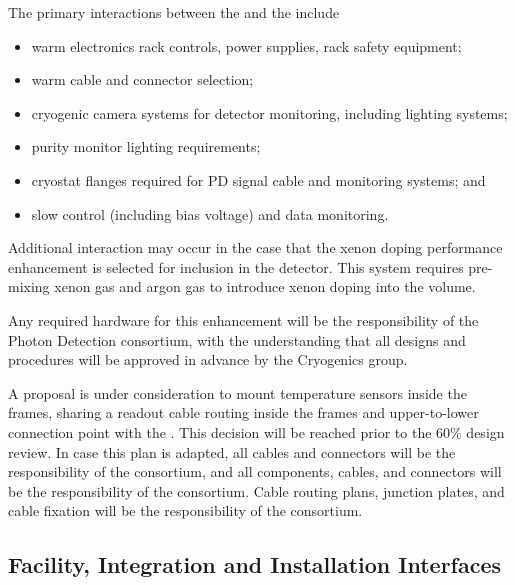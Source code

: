 The primary interactions between the  and the  include

\begin{itemize}
    \item warm electronics rack controls, power supplies, rack safety equipment;
    \item warm cable and connector selection;
    \item cryogenic camera systems for detector monitoring, including lighting systems;
    \item purity monitor lighting requirements;
    \item cryostat flanges required for PD signal cable and monitoring systems; and
    \item {} slow control (including bias voltage) and data monitoring.
\end{itemize}

Additional interaction may occur in the case that the xenon doping performance enhancement is selected for inclusion in the detector.  This system requires pre-mixing xenon gas and argon gas to introduce xenon doping into the \lar volume. 


Any required hardware for this enhancement will be the responsibility of the Photon Detection consortium, with the understanding that all designs and procedures will be approved in advance by the Cryogenics group. 


A proposal is under consideration to mount  temperature sensors inside the  frames, sharing a readout cable routing inside the  frames and upper-to-lower  connection point with the .  This decision will be reached prior to the 60\% design review.  In case this plan is adapted, all  cables and connectors will be the responsibility of the  consortium, and all  components, cables, and connectors will be the responsibility of the  consortium.  Cable routing plans, junction plates, and cable fixation will be the responsibility of the  consortium.

\subsection{Facility, Integration and Installation Interfaces}

